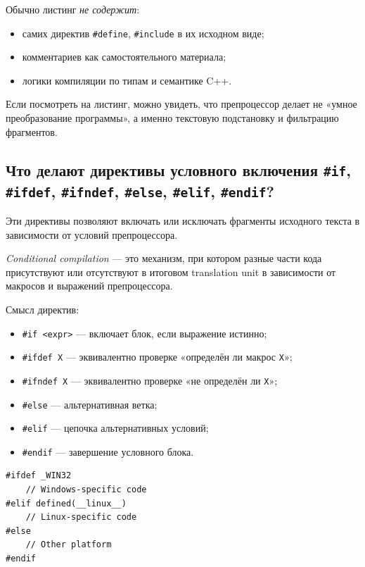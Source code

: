 Обычно листинг \emph{не содержит}:
\begin{itemize}
    \item самих директив \texttt{\#define}, \texttt{\#include} в их исходном виде;
    \item комментариев как самостоятельного материала;
    \item логики компиляции по типам и семантике C++.
\end{itemize}

\begin{remark}
Если посмотреть на листинг, можно увидеть, что препроцессор делает не «умное преобразование программы», а именно текстовую подстановку и фильтрацию фрагментов.
\end{remark}

\subsection{Что делают директивы условного включения \texttt{\#if}, \texttt{\#ifdef}, \texttt{\#ifndef}, \texttt{\#else}, \texttt{\#elif}, \texttt{\#endif}?}
Эти директивы позволяют включать или исключать фрагменты исходного текста в зависимости от условий препроцессора.

\begin{definition}
\textit{Conditional compilation} — это механизм, при котором разные части кода присутствуют или отсутствуют в итоговом translation unit в зависимости от макросов и выражений препроцессора.
\end{definition}

Смысл директив:
\begin{itemize}
    \item \texttt{\#if <expr>} — включает блок, если выражение истинно;
    \item \texttt{\#ifdef X} — эквивалентно проверке «определён ли макрос \texttt{X}»;
    \item \texttt{\#ifndef X} — эквивалентно проверке «не определён ли \texttt{X}»;
    \item \texttt{\#else} — альтернативная ветка;
    \item \texttt{\#elif} — цепочка альтернативных условий;
    \item \texttt{\#endif} — завершение условного блока.
\end{itemize}

\begin{example}
\begin{verbatim}
#ifdef _WIN32
    // Windows-specific code
#elif defined(__linux__)
    // Linux-specific code
#else
    // Other platform
#endif
\end{verbatim}
\end{example}

